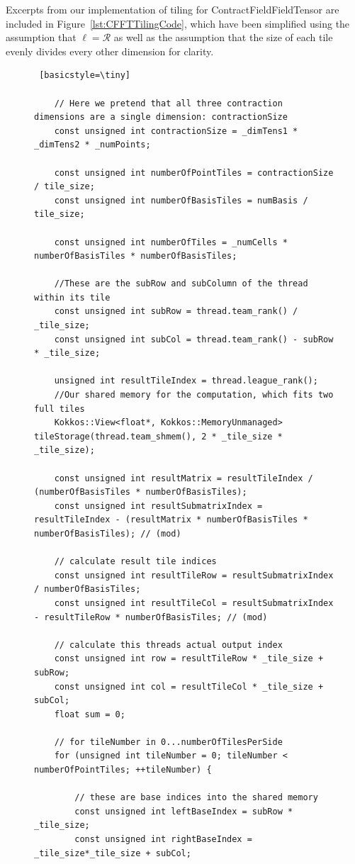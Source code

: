 Excerpts from our implementation of tiling for ContractFieldFieldTensor are included in Figure~\ref{lst:CFFTTilingCode}, which have been simplified using the assumption that $\ell=\mathcal{R}$ as well as the assumption that the size of each tile evenly divides every other dimension for clarity. 

\begin{figure}[H]
    \begin{lstlisting} [basicstyle=\tiny]

    // Here we pretend that all three contraction dimensions are a single dimension: contractionSize
    const unsigned int contractionSize = _dimTens1 * _dimTens2 * _numPoints;
    
    const unsigned int numberOfPointTiles = contractionSize / tile_size;
    const unsigned int numberOfBasisTiles = numBasis / tile_size;

    const unsigned int numberOfTiles = _numCells * numberOfBasisTiles * numberOfBasisTiles;
    
    //These are the subRow and subColumn of the thread within its tile
    const unsigned int subRow = thread.team_rank() / _tile_size;
    const unsigned int subCol = thread.team_rank() - subRow * _tile_size;

    unsigned int resultTileIndex = thread.league_rank();
    //Our shared memory for the computation, which fits two full tiles
    Kokkos::View<float*, Kokkos::MemoryUnmanaged> tileStorage(thread.team_shmem(), 2 * _tile_size * _tile_size);

    const unsigned int resultMatrix = resultTileIndex / (numberOfBasisTiles * numberOfBasisTiles);
    const unsigned int resultSubmatrixIndex = resultTileIndex - (resultMatrix * numberOfBasisTiles * numberOfBasisTiles); // (mod)

    // calculate result tile indices
    const unsigned int resultTileRow = resultSubmatrixIndex / numberOfBasisTiles;
    const unsigned int resultTileCol = resultSubmatrixIndex - resultTileRow * numberOfBasisTiles; // (mod)

    // calculate this threads actual output index
    const unsigned int row = resultTileRow * _tile_size + subRow;
    const unsigned int col = resultTileCol * _tile_size + subCol;
    float sum = 0;

    // for tileNumber in 0...numberOfTilesPerSide
    for (unsigned int tileNumber = 0; tileNumber < numberOfPointTiles; ++tileNumber) {

        // these are base indices into the shared memory
        const unsigned int leftBaseIndex = subRow * _tile_size;
        const unsigned int rightBaseIndex = _tile_size*_tile_size + subCol;


\end{lstlisting}
\end{figure}
